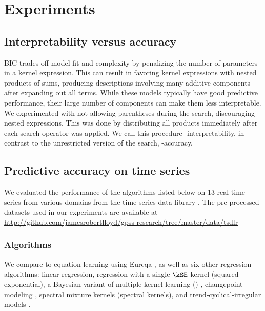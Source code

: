 \section{Experiments}
\label{sec:numerical}

\subsection{Interpretability versus accuracy}

BIC trades off model fit and complexity by penalizing the number of parameters in a kernel expression.
This can result in \procedurename{} favoring kernel expressions with nested products of sums, producing descriptions involving many additive components after expanding out all terms.
While these models typically have good predictive performance, their large number of components can make them less interpretable.
We experimented with not allowing parentheses during the search, discouraging nested expressions.
This was done by distributing all products immediately after each search operator was applied.
We call this procedure \procedurename{}-interpretability, in contrast to the unrestricted version of the search, \procedurename{}-accuracy.


\subsection{Predictive accuracy on time series}
\label{sec:Predictive accuracy on time series}


We evaluated the performance of the algorithms listed below on 13 real time-series from various domains from the time series data library \citep{TSDL}.
The pre-processed datasets used in our experiments are available at \\\url{http://github.com/jamesrobertlloyd/gpss-research/tree/master/data/tsdlr}



\subsubsection{Algorithms}

We compare \procedurename{} to equation learning using Eureqa \citep{Eureqa}, as well as six other regression algorithms:
linear regression,
\gp{} regression with a single $\kSE$ kernel (squared exponential),
a Bayesian variant of multiple kernel learning (\MKL{}) \citep[e.g.][]{gonen2011multiple, bach2004multiple},
changepoint modeling \citep[e.g.][]{garnett2010sequential, saatcci2010gaussian, FoxDunson:NIPS2012},
spectral mixture kernels \citep{WilAda13} (spectral kernels),
and trend-cyclical-irregular models \citep[e.g.][]{lind2006basic}.

